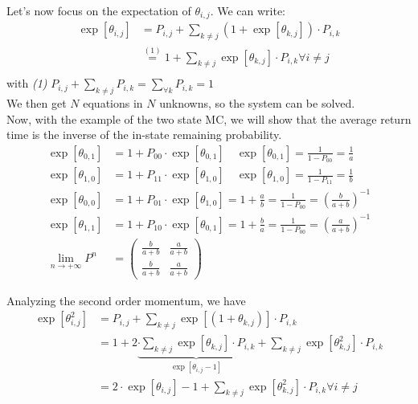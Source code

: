 Let's now focus on the expectation of $\theta_{i,j}$. We can write:
\begin{equation}\begin{split}
	\exp[\theta_{i,j}] &= P_{i,j} + \sum\limits_{k \neq j} (1+\exp[\theta_{k,j}])\cdot P_{i,k}\\
	&\stackrel{(1)}{=} 1+ \sum\limits_{k \neq j} \exp[\theta_{k,j}] \cdot P_{i,k} \forall i \neq j\\
\end{split}\end{equation}
with \textit{(1)} $P_{i,j} + \sum\limits_{k\neq j}P_{i,k} =\sum\limits_{\forall k}P_{i,k} = 1 $
\\
We then get $N$ equations in $N$ unknowns, so the system can be solved.
\\
Now, with the example of the two state MC, we will show that the average return
time is the inverse of the in-state remaining probability.
\begin{equation}\begin{split}
	\exp[\theta_{0,1}] &= 1 + P_{00} \cdot \exp[\theta_{0,1}] \quad \exp[\theta_{0,1}] = \frac{1}{1-P_{00}} = \frac{1}{a}\\
	\exp[\theta_{1,0}] &= 1 + P_{11} \cdot \exp[\theta_{1,0}] \quad \exp[\theta_{1,0}] = \frac{1}{1-P_{11}} = \frac{1}{b}\\
	\exp[\theta_{0,0}] &= 1 + P_{01} \cdot \exp[\theta_{1,0}] =1+\frac{a}{b} = \frac{1}{1-P_{00}} = \left(\frac{b}{a+b}\right)^{-1}\\
	\exp[\theta_{1,1}] &= 1 + P_{10} \cdot \exp[\theta_{0,1}] =1+\frac{b}{a} = \frac{1}{1-P_{00}} = \left(\frac{a}{a+b}\right)^{-1}\\
	\lim_{n \to +\infty} P^n &=
	\begin{pmatrix}
		\frac{b}{a+b} & \frac{a}{a+b} \\
		\frac{b}{a+b} & \frac{a}{a+b}
	\end{pmatrix}
\end{split}\end{equation}

Analyzing the second order momentum, we have
\begin{equation}\begin{split}
	\exp[\theta_{i,j}^2] &= P_{i,j} + \sum\limits_{k \neq j} \exp[(1+\theta_{k,j})]\cdot P_{i,k}\\
	&= 1 + 2 \underbrace{\cdot \sum\limits_{k \neq j} \exp[\theta_{k,j}]\cdot P_{i,k}}_{\exp[\theta_{i,j}-1]} + \sum\limits_{k \neq j} \exp[\theta_{k,j}^2] \cdot P_{i,k}\\
	&= 2 \cdot \exp[\theta_{i,j}]-1 +  \sum\limits_{k \neq j} \exp[\theta_{k,j}^2] \cdot P_{i,k} \forall i \neq j \\
\end{split}\end{equation}

